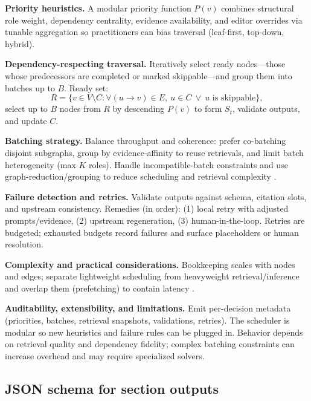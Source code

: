 \documentclass{article}%
\begin{document}
\textbf{Priority heuristics.}
A modular priority function \(P(v)\) combines structural role weight, dependency centrality, evidence availability, and editor overrides via tunable aggregation so practitioners can bias traversal (leaf-first, top-down, hybrid).

\textbf{Dependency-respecting traversal.}
Iteratively select ready nodes—those whose predecessors are completed or marked skippable—and group them into batches up to \(B\).
Ready set:
\[
R=\{v\in V\setminus C:\forall (u\rightarrow v)\in E,\ u\in C\ \lor\ u\text{ is skippable}\},
\]
select up to \(B\) nodes from \(R\) by descending \(P(v)\) to form \(S_t\), validate outputs, and update \(C\).

\textbf{Batching strategy.}
Balance throughput and coherence: prefer co-batching disjoint subgraphs, group by evidence-affinity to reuse retrievals, and limit batch heterogeneity (max \(K\) roles).
Handle incompatible-batch constraints and use graph-reduction/grouping to reduce scheduling and retrieval complexity \cite{web_huertas_2024_parallel_batch_scheduling_with_incompatible_job_,web_mostafa_2024_intent_aware_drl_based_noma_uplink_dynamic_sched}.

\textbf{Failure detection and retries.}
Validate outputs against schema, citation slots, and upstream consistency. Remedies (in order): (1) local retry with adjusted prompts/evidence, (2) upstream regeneration, (3) human-in-the-loop. Retries are budgeted; exhausted budgets record failures and surface placeholders or human resolution.

\textbf{Complexity and practical considerations.}
Bookkeeping scales with nodes and edges; separate lightweight scheduling from heavyweight retrieval/inference and overlap them (prefetching) to contain latency \cite{web_sudarsan_2007_reshape_a_framework_for_dynamic_resizing_and_sch}.

\textbf{Auditability, extensibility, and limitations.}
Emit per-decision metadata (priorities, batches, retrieval snapshots, validations, retries). The scheduler is modular so new heuristics and failure rules can be plugged in. Behavior depends on retrieval quality and dependency fidelity; complex batching constraints can increase overhead and may require specialized solvers.%

%
\subsection{JSON schema for section outputs}%
\end{document}
